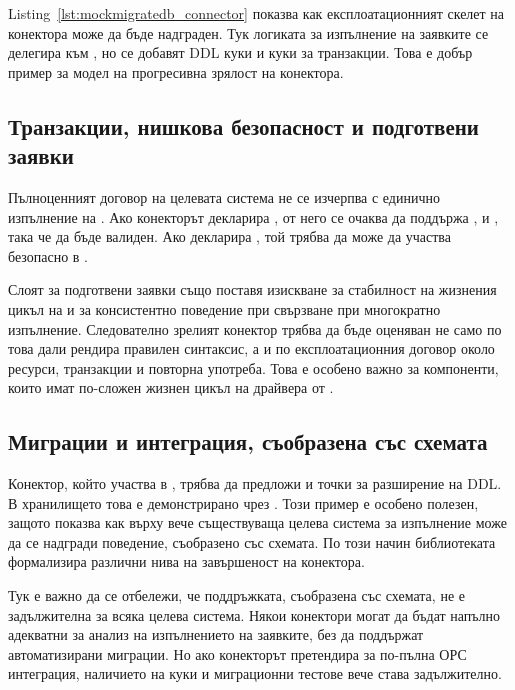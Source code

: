Listing~\ref{lst:mockmigratedb_connector} показва как експлоатационният скелет на конектора може да бъде надграден. Тук логиката за изпълнение на заявките се делегира към , но се добавят DDL куки и куки за транзакции. Това е добър пример за модел на прогресивна зрялост на конектора.

\subsection{Транзакции, нишкова безопасност и подготвени заявки}

Пълноценният договор на целевата система не се изчерпва с единично изпълнение на . Ако конекторът декларира , от него се очаква да поддържа ,  и , така че  да бъде валиден. Ако декларира , той трябва да може да участва безопасно в .

Слоят за подготвени заявки също поставя изискване за стабилност на жизнения цикъл на  и за консистентно поведение при свързване при многократно изпълнение. Следователно зрелият конектор трябва да бъде оценяван не само по това дали рендира правилен синтаксис, а и по експлоатационния договор около ресурси, транзакции и повторна употреба. Това е особено важно за компоненти, които имат по-сложен жизнен цикъл на драйвера от .

\subsection{Миграции и интеграция, съобразена със схемата}

Конектор, който участва в , трябва да предложи и точки за разширение на DDL. В хранилището това е демонстрирано чрез . Този пример е особено полезен, защото показва как върху вече съществуваща целева система за изпълнение може да се надгради поведение, съобразено със схемата. По този начин библиотеката формализира различни нива на завършеност на конектора.

Тук е важно да се отбележи, че поддръжката, съобразена със схемата, не е задължителна за всяка целева система. Някои конектори могат да бъдат напълно адекватни за анализ на изпълнението на заявките, без да поддържат автоматизирани миграции. Но ако конекторът претендира за по-пълна ОРС интеграция, наличието на  куки и миграционни тестове вече става задължително.

